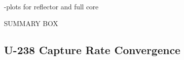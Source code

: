 \clearpage

-plots for reflector and full core

SUMMARY BOX


\subsection{U-238 Capture Rate Convergence}
\label{subsec:chap11-capture-converge}

\clearpage

